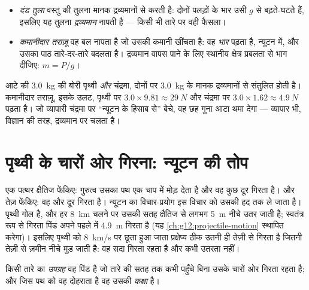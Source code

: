 \begin{method}[तुला और कमानीदार तराज़ू]\label{met:g10:universal-gravitation:instruments}
\begin{itemize}
  \item \emph{दंड तुला} वस्तु की तुलना मानक द्रव्यमानों से करती है:
        दोनों पलड़ों के भार उसी $g$ से बढ़ते-घटते हैं,
        इसलिए यह तुलना \emph{द्रव्यमान} नापती है --- किसी भी तारे पर
        वही फैसला।
  \item \emph{कमानीदार तराज़ू} वह बल नापता है जो उसकी कमानी खींचता है:
        वह \emph{भार} पढ़ता है, न्यूटन में, और उसका पाठ
        तारे-दर-तारे बदलता है। द्रव्यमान वापस पाने के लिए स्थानीय
        क्षेत्र प्रबलता से भाग दीजिए: $m = P/g$।
\end{itemize}
\end{method}

\begin{example}[चंद्रमा पर आटा]\label{ex:g10:universal-gravitation:flour}
आटे की \qty{3.0}{kg} की बोरी पृथ्वी \emph{और} चंद्रमा, दोनों पर \qty{3.0}{kg} के
मानक द्रव्यमानों से संतुलित होती है। कमानीदार तराज़ू, इसके उलट, पृथ्वी
पर $3.0 \times 9.81 \approx \qty{29}{N}$ और चंद्रमा पर $3.0 \times 1.62 \approx \qty{4.9}{N}$ पढ़ता है। जो व्यापारी चंद्रमा पर
``न्यूटन के हिसाब से'' बेचे, वह छह गुना आटा थमा देगा --- व्यापार भी,
विज्ञान की तरह, द्रव्यमान पर चलता है।
\end{example}

\section{पृथ्वी के चारों ओर गिरना: न्यूटन की तोप}

एक पत्थर क्षैतिज फेंकिए: गुरुत्व उसका पथ एक चाप में मोड़ देता है और वह
कुछ  दूर गिरता है। और तेज़ फेंकिए: वह और दूर गिरता है। न्यूटन का
विचार-प्रयोग इस विचार को उसकी हद तक ले जाता है। पृथ्वी गोल है, और हर
\qty{8}{km} चलने पर उसकी सतह क्षैतिज से लगभग \qty{5}{m} नीचे उतर जाती है;
स्वतंत्र रूप से गिरता पिंड अपने पहले  में \qty{4.9}{m} गिरता है (यह
\cref{ch:g12:projectile-motion} स्थापित करेगा)। इसलिए पृथ्वी को \qty{8}{km/s} पर छूता हुआ जाता
प्रक्षेप्य ठीक उतनी ही तेज़ी से गिरता है जितनी तेज़ी से ज़मीन नीचे मुड़
जाती है: वह सदा गिरता रहता है और कभी उतरता नहीं।

\begin{definition}[उपग्रह और कक्षा]\label{def:g10:universal-gravitation:satellite}
किसी तारे का \emph{उपग्रह} वह पिंड है जो तारे की सतह तक
कभी पहुँचे बिना उसके चारों ओर गिरता रहता है; और जिस पथ को वह दोहराता है
वह उसकी \emph{कक्षा} है।
\end{definition}


